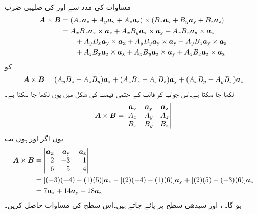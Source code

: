 مساوات  کی  مدد سے  اور  کی صلیبی ضرب
\begin{align*}
\kvec{A} \times \kvec{B}&=(A_x\ax+A_y\ay+A_z\az) \times (B_x\ax+B_y\ay+B_z\az)\\
&=A_x B_x \ax \times \ax+A_x B_y \ax \times \ay+A_x B_z \ax \times \az\\
& \quad \quad +A_y B_x \ay \times \ax+A_y B_y \ay \times \ay+A_y B_z \ay \times \az \\
&\quad \quad +A_z B_x \az \times \ax+A_z B_y \az \times \ay+A_z B_z \az \times \az
\end{align*}
کو
\begin{align}
\kvec{A} \times \kvec{B}=(A_y B_z-A_z B_y)\ax+(A_z B_x-A_x B_z)\ay+(A_x B_y-A_y B_x)\az
\end{align}
لکھا جا سکتا ہے۔اس جواب کو قالب کے حتمی قیمت کی شکل میں یوں لکھا جا سکتا ہے۔
\begin{align}
\kvec{A} \times \kvec{B}=\begin{vmatrix}
\ax & \ay & \az\\
A_x & A_y & A_z\\
B_x & B_y & B_z
\end{vmatrix}
\end{align}
یوں اگر  اور  ہوں تب
\begin{align*}
\kvec{A} \times \kvec{B}&=\begin{vmatrix*}[r]
\ax & \ay & \az\\
2 & -3 & 1\\
6 & 5 & -4
\end{vmatrix*}\\
&=[(-3)(-4)-(1)(5)]\ax-[(2)(-4)-(1)(6)]\ay+[(2)(5)-(-3)(6)]\az\\
&=7\ax+14\ay+18\az
\end{align*}
ہو گا۔
،  اور  سیدھی سطح پر پائے جاتے ہیں۔اس سطح کی مساوات حاصل کریں۔

